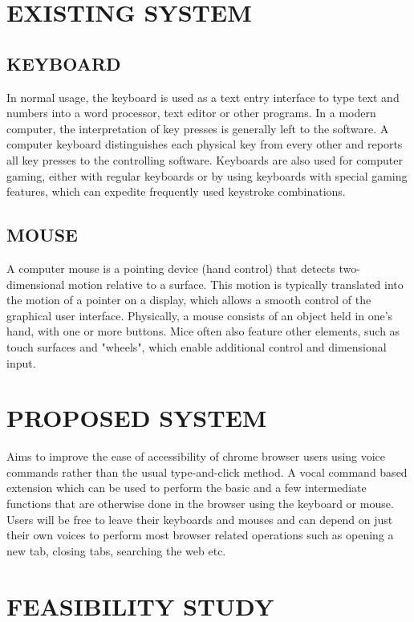\documentclass[11pt]{report} %
\begin{document}
\section{EXISTING SYSTEM}
\label{sec:EXISTING SYSTEM}

\subsection{KEYBOARD}
\label{subsec:KEYBOARD} 
In normal usage, the keyboard is used as a text entry interface to type text and numbers into a word processor, text editor or other programs. In a modern computer, the interpretation of key presses is generally left to the software. A computer keyboard distinguishes each physical key from every other and reports all key presses to the controlling software. Keyboards are also used for computer gaming, either with regular keyboards or by using keyboards with special gaming features, which can expedite frequently used keystroke combinations.

\subsection{MOUSE}
\label{subsec:MOUSE}
A computer mouse is a pointing device (hand control) that detects two-dimensional motion relative to a surface. This motion is typically translated into the motion of a pointer on a display, which allows a smooth control of the graphical user interface.
Physically, a mouse consists of an object held in one's hand, with one or more buttons. Mice often also feature other elements, such as touch surfaces and "wheels", which enable additional control and dimensional input.

\section{PROPOSED SYSTEM}
\label{sec:PROPOSED SYSTEM}
Aims to improve the ease of accessibility of chrome browser users using voice commands rather than the usual type-and-click method.
A vocal command based extension which can be used to perform the basic and a few intermediate functions that are otherwise done in the browser using the keyboard or mouse.
Users will be free to leave their keyboards and mouses and can depend on just their own voices to perform most browser related operations such as opening a new tab, closing tabs, searching the web etc. 

\section{FEASIBILITY STUDY}
\label{sec:FEASIBILITY STUDY}
\end{document}
